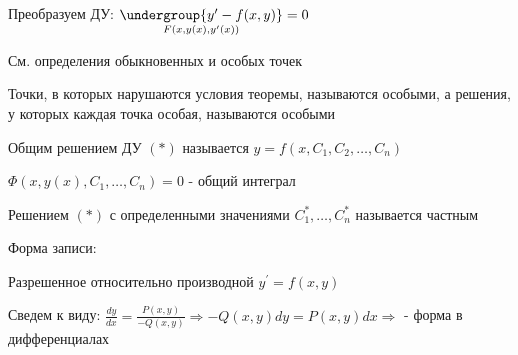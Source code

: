\documentclass[12pt]{article}
\begin{document}
    \Nota Преобразуем ДУ: $\underset{F(x, y(x), y^\prime(x))}{\undergroup{y^\prime - f(x, y)}} = 0$

    См. определения обыкновенных и особых точек

     Точки, в которых нарушаются условия теоремы, называются особыми, а решения, у которых каждая точка особая,
    называются особыми

     Общим решением ДУ $(*)$ называется $y = f(x, C_1, C_2, \dots, C_n)$

    \Notas $\Phi(x, y(x), C_1, \dots, C_n) = 0$ - общий интеграл

     Решением $(*)$ с определенными значениями $C_1^*, \dots, C_n^*$ называется частным

    \Nota Форма записи:

    Разрешенное относительно производной $y^\prime = f(x, y)$

    Сведем к виду: $\frac{dy}{dx} = \frac{P(x, y)}{-Q(x, y)} \Longrightarrow -Q(x, y)dy = P(x, y)dx \Longrightarrow $
     - форма в дифференциалах
\end{document}
